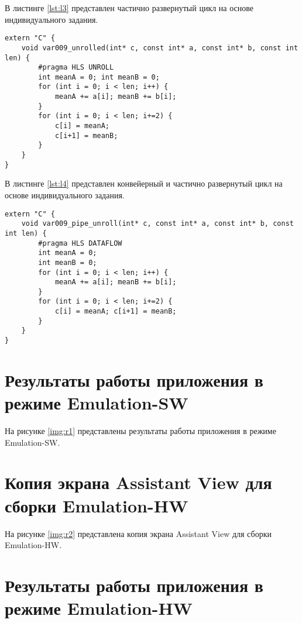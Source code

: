 В листинге \ref{lst:l3} представлен частично развернутый цикл на основе индивидуального задания.
\captionsetup{singlelinecheck = false, justification=raggedright}
\begin{lstlisting}[label=lst:l3,caption=Индивидуальный вариант 9]
extern "C" {
	void var009_unrolled(int* c, const int* a, const int* b, const int len) {
		#pragma HLS UNROLL
		int meanA = 0; int meanB = 0;
		for (int i = 0; i < len; i++) {
			meanA += a[i]; meanB += b[i];
		}
		for (int i = 0; i < len; i+=2) {
			c[i] = meanA;
			c[i+1] = meanB;
		}
	}
}

\end{lstlisting}

В листинге \ref{lst:l4} представлен конвейерный и частично развернутый цикл на основе индивидуального задания.
\captionsetup{singlelinecheck = false, justification=raggedright}
\begin{lstlisting}[label=lst:l4,caption=Индивидуальный вариант 9]
extern "C" {
	void var009_pipe_unroll(int* c, const int* a, const int* b, const int len) {
		#pragma HLS DATAFLOW
		int meanA = 0;
		int meanB = 0;
		for (int i = 0; i < len; i++) {
			meanA += a[i]; meanB += b[i];
		}
		for (int i = 0; i < len; i+=2) {
			c[i] = meanA; c[i+1] = meanB;
		}
	}
}
\end{lstlisting}


\chapter*{Результаты работы приложения в режиме Emulation-SW}

На рисунке \ref{img:r1} представлены результаты работы приложения в режиме Emulation-SW.



\chapter*{Копия экрана Assistant View для сборки Emulation-HW}

На рисунке \ref{img:r2} представлена копия экрана Assistant View для сборки Emulation-HW.



\chapter*{Результаты работы приложения в режиме Emulation-HW}

